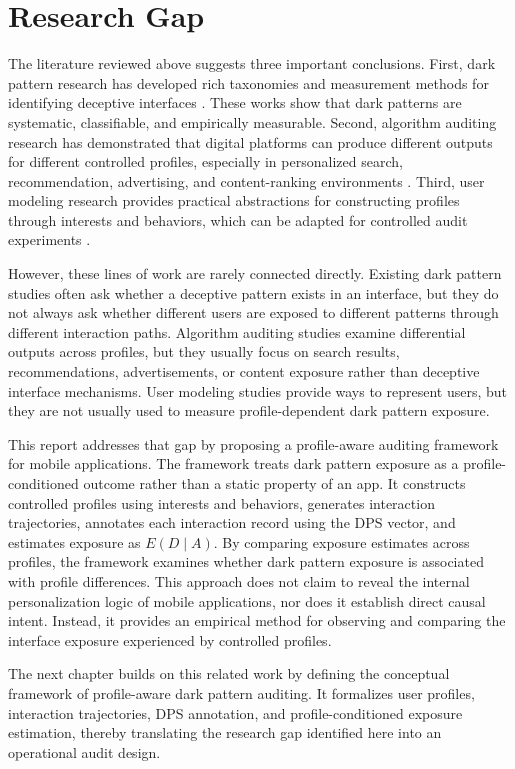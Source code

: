 \section{Research Gap}

The literature reviewed above suggests three important conclusions. First, dark pattern research has developed rich taxonomies and measurement methods for identifying deceptive interfaces \cite{gray2018darkpatterns,mathur2019darkpatterns,mathur2021whatmakesdark,nouwens2020gdpr}. These works show that dark patterns are systematic, classifiable, and empirically measurable. Second, algorithm auditing research has demonstrated that digital platforms can produce different outputs for different controlled profiles, especially in personalized search, recommendation, advertising, and content-ranking environments \cite{sandvig2014auditing,hannak2013personalization,ribeiro2020auditing}. Third, user modeling research provides practical abstractions for constructing profiles through interests and behaviors, which can be adapted for controlled audit experiments \cite{eke2019userprofiling,purificato2024usermodeling}.

However, these lines of work are rarely connected directly. Existing dark pattern studies often ask whether a deceptive pattern exists in an interface, but they do not always ask whether different users are exposed to different patterns through different interaction paths. Algorithm auditing studies examine differential outputs across profiles, but they usually focus on search results, recommendations, advertisements, or content exposure rather than deceptive interface mechanisms. User modeling studies provide ways to represent users, but they are not usually used to measure profile-dependent dark pattern exposure.

This report addresses that gap by proposing a profile-aware auditing framework for mobile applications. The framework treats dark pattern exposure as a profile-conditioned outcome rather than a static property of an app. It constructs controlled profiles using interests and behaviors, generates interaction trajectories, annotates each interaction record using the DPS vector, and estimates exposure as \(E(D \mid A)\). By comparing exposure estimates across profiles, the framework examines whether dark pattern exposure is associated with profile differences. This approach does not claim to reveal the internal personalization logic of mobile applications, nor does it establish direct causal intent. Instead, it provides an empirical method for observing and comparing the interface exposure experienced by controlled profiles.

The next chapter builds on this related work by defining the conceptual framework of profile-aware dark pattern auditing. It formalizes user profiles, interaction trajectories, DPS annotation, and profile-conditioned exposure estimation, thereby translating the research gap identified here into an operational audit design.
